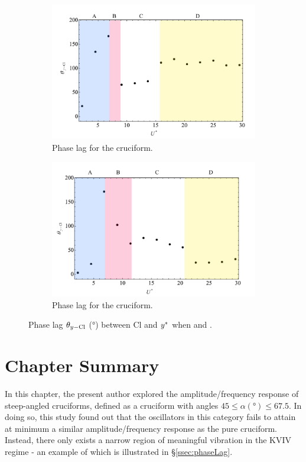 \documentclass[oneside]{utmthesis}
\begin{document}
\begin{figure}
  \centering
  \begin{subfigure}[h]{1\textwidth}
    \includegraphics[width=\textwidth]{figs/phaseLag4}
    \caption{Phase lag for the \angfo{} cruciform.}
    \label{fig:phaseLag675deg}
  \end{subfigure}
  
  \begin{subfigure}[h]{1\textwidth}
    \includegraphics[width=\textwidth]{figs/phaseLag3}
    \caption{Phase lag for the \angth{} cruciform.}
    \label{fig:phaseLag45deg}
  \end{subfigure}

  \caption{Phase lag $\theta_{y-\text{Cl}}$ (\si{\degree}) between Cl and $y^{*}$ when \angfo{} and \angth{}.}
  \label{fig:phaseLag67545deg}
\end{figure}


\section{Chapter Summary} \label{sec:chapSumSteep}
In this chapter, the present author explored the amplitude/frequency response of steep-angled cruciforms, defined as a cruciform with angles $45 \leq \alpha (\si{\degree}) \leq 67.5$. In doing so, this study found out that the oscillators in this category fails to attain at minimum a similar amplitude/frequency response as the pure cruciform. Instead, there only exists a narrow region of meaningful vibration in the KVIV regime - an example of which is illustrated in \S\ref{ssec:phaseLag}.
\end{document}
